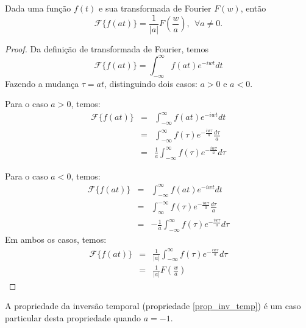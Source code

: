 \begin{propr}\label{prop_mud_esc} Dada uma função $f(t)$ e sua transformada de Fourier $F(w)$, então 
$$
\mathcal{F}\{f(at)\}=\frac{1}{|a|}F\left(\frac{w}{a}\right),~~ \forall a\neq 0.
$$
\end{propr}
\begin{proof} Da definição de transformada de Fourier, temos
$$
\mathcal{F}\{f(at)\}=\int_{-\infty}^{\infty} f(at)e^{-iwt}dt
$$
Fazendo a mudança $\tau= at$, distinguindo dois casos: $a>0$ e $a<0$.

Para o caso $a>0$, temos:
\begin{eqnarray*}
\mathcal{F}\{f(at)\}&=&\int_{-\infty}^{\infty} f(at)e^{-iwt}dt\\
&=&\int_{-\infty}^{\infty} f(\tau)e^{-\frac{iw\tau}{a}}\frac{d\tau}{a}\\
&=&\frac{1}{a}\int_{-\infty}^{\infty} f(\tau)e^{-\frac{iw\tau}{a}}d\tau
\end{eqnarray*}

Para o caso $a<0$, temos:
\begin{eqnarray*}
\mathcal{F}\{f(at)\}&=&\int_{-\infty}^{\infty} f(at)e^{-iwt}dt\\
&=&\int_{\infty}^{-\infty} f(\tau)e^{-\frac{iw\tau}{a}}\frac{d\tau}{a}\\
&=&-\frac{1}{a}\int_{-\infty}^{\infty} f(\tau)e^{-\frac{iw\tau}{a}}d\tau
\end{eqnarray*}
Em ambos os casos, temos:
\begin{eqnarray*}
\mathcal{F}\{f(at)\}&=&\frac{1}{|a|}\int_{-\infty}^{\infty} f(\tau)e^{-\frac{iw\tau}{a}}d\tau\\
&=&\frac{1}{|a|}F\left(\frac{w}{a}\right)
\end{eqnarray*}
\end{proof}
\begin{obs} A propriedade da inversão temporal (propriedade \ref{prop_inv_temp}) é um caso particular desta propriedade quando $a=-1$.
\end{obs}


